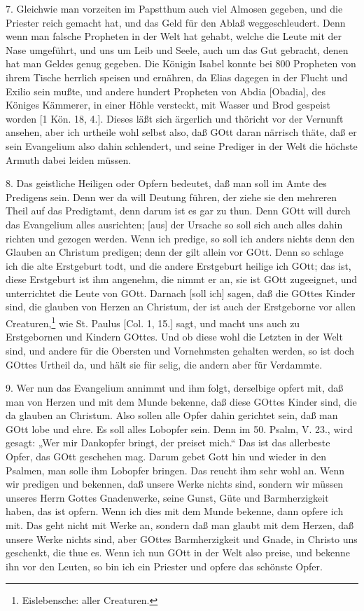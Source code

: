 7. Gleichwie man vorzeiten im Papstthum auch viel Almosen gegeben, und die Priester reich gemacht hat, und das Geld für den Ablaß weggeschleudert. Denn wenn man falsche Propheten in der Welt hat gehabt, welche die Leute mit der Nase umgeführt, und uns um Leib und Seele, auch um das Gut gebracht, denen hat man Geldes genug gegeben. Die Königin Isabel konnte bei 800 Propheten von ihrem Tische herrlich speisen und ernähren, da Elias dagegen in der Flucht und Exilio sein mußte, und andere hundert Propheten von Abdia [Obadia], des Königes Kämmerer, in einer Höhle versteckt, mit Wasser und Brod gespeist worden [1 Kön. 18, 4.]. Dieses läßt sich ärgerlich und thöricht vor der Vernunft ansehen, aber ich urtheile wohl selbst also, daß GOtt daran närrisch thäte, daß er sein Evangelium also dahin schlendert, und seine Prediger in der Welt die höchste Armuth dabei leiden müssen.

8. Das geistliche Heiligen oder Opfern bedeutet, daß man soll im Amte des Predigens sein. Denn wer da will Deutung führen, der ziehe sie den mehreren Theil auf das Predigtamt, denn darum ist es gar zu thun. Denn GOtt will durch das Evangelium alles ausrichten; [aus] der Ursache so soll sich auch alles dahin richten und gezogen werden. Wenn ich predige, so soll ich anders nichts denn den Glauben an Christum predigen; denn der gilt allein vor GOtt. Denn so schlage ich die alte Erstgeburt todt, und die andere Erstgeburt heilige ich GOtt; das ist, diese Erstgeburt ist ihm angenehm, die nimmt er an, sie ist GOtt zugeeignet, und unterrichtet die Leute von GOtt. Darnach [soll ich] sagen, daß die GOttes Kinder sind, die glauben von Herzen an Christum, der ist auch der Erstgeborne vor allen Creaturen,\footnote{Eislebensche: aller Creaturen.} wie St. Paulus [Col. 1, 15.] sagt, und macht uns auch zu Erstgebornen und Kindern GOttes. Und ob diese wohl die Letzten in der Welt sind, und andere für die Obersten und Vornehmsten gehalten werden, so ist doch GOttes Urtheil da, und hält sie für selig, die andern aber für Verdammte.

9. Wer nun das Evangelium annimmt und ihm folgt, derselbige opfert mit, daß man von Herzen und mit dem Munde bekenne, daß diese GOttes Kinder sind, die da glauben an Christum. Also sollen alle Opfer dahin gerichtet sein, daß man GOtt lobe und ehre. Es soll alles Lobopfer sein. Denn im 50. Psalm, V. 23., wird gesagt: „Wer mir Dankopfer bringt, der preiset mich.“ Das ist das allerbeste Opfer, das GOtt geschehen mag. Darum gebet Gott hin und wieder in den Psalmen, man solle ihm Lobopfer bringen. Das reucht ihm sehr wohl an. Wenn wir predigen und bekennen, daß unsere Werke nichts sind, sondern wir müssen unseres Herrn Gottes Gnadenwerke, seine Gunst, Güte und Barmherzigkeit haben, das ist opfern. Wenn ich dies mit dem Munde bekenne, dann opfere ich mit. Das geht nicht mit Werke an, sondern daß man glaubt mit dem Herzen, daß unsere Werke nichts sind, aber GOttes Barmherzigkeit und Gnade, in Christo uns geschenkt, die thue es. Wenn ich nun GOtt in der Welt also preise, und bekenne ihn vor den Leuten, so bin ich ein Priester und opfere das schönste Opfer.

